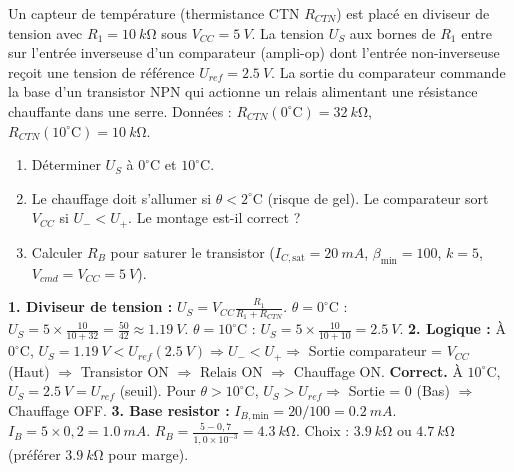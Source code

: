 \documentclass[11pt]{article}
\begin{document}
\begin{exoresolu}
Un capteur de température (thermistance CTN $R_{CTN}$) est placé en diviseur de tension avec $R_1 = \SI{10}{k\ohm}$ sous $V_{CC}=\SI{5}{V}$. La tension $U_S$ aux bornes de $R_1$ entre sur l'entrée inverseuse d'un comparateur (ampli-op) dont l'entrée non-inverseuse reçoit une tension de référence $U_{ref} = \SI{2,5}{V}$. La sortie du comparateur commande la base d'un transistor NPN qui actionne un relais alimentant une résistance chauffante dans une serre.
Données : $R_{CTN}(0^\circ\text{C}) = \SI{32}{k\ohm}$, $R_{CTN}(10^\circ\text{C}) = \SI{10}{k\ohm}$.
\begin{enumerate}
\item Déterminer $U_S$ à $0^\circ\text{C}$ et $10^\circ\text{C}$.
\item Le chauffage doit s'allumer si $\theta < 2^\circ\text{C}$ (risque de gel). Le comparateur sort $V_{CC}$ si $U_- < U_+$. Le montage est-il correct ?
\item Calculer $R_B$ pour saturer le transistor ($I_{C,\text{sat}}=\SI{20}{mA}$, $\beta_{\min}=100$, $k=5$, $V_{cmd}=V_{CC}=\SI{5}{V}$).
\end{enumerate}
\tcblower
\textbf{1. Diviseur de tension :} $U_S = V_{CC} \frac{R_1}{R_1 + R_{CTN}}$.
$\theta = 0^\circ\text{C}$ : $U_S = 5 \times \frac{10}{10+32} = \frac{50}{42} \approx \SI{1,19}{V}$.
$\theta = 10^\circ\text{C}$ : $U_S = 5 \times \frac{10}{10+10} = \SI{2,5}{V}$.
\textbf{2. Logique :} À $0^\circ\text{C}$, $U_S = \SI{1,19}{V} < U_{ref} (\SI{2,5}{V}) \Rightarrow U_- < U_+ \Rightarrow$ Sortie comparateur = $V_{CC}$ (Haut) $\Rightarrow$ Transistor ON $\Rightarrow$ Relais ON $\Rightarrow$ Chauffage ON. \textbf{Correct.}
À $10^\circ\text{C}$, $U_S = \SI{2,5}{V} = U_{ref}$ (seuil). Pour $\theta > 10^\circ\text{C}$, $U_S > U_{ref} \Rightarrow$ Sortie = $0$ (Bas) $\Rightarrow$ Chauffage OFF.
\textbf{3. Base resistor :}
$I_{B,\text{min}} = 20/100 = \SI{0,2}{mA}$.
$I_B = 5 \times 0,2 = \SI{1,0}{mA}$.
$R_B = \frac{5 - 0,7}{1,0 \times 10^{-3}} = \SI{4,3}{k\ohm}$. Choix : $\SI{3,9}{k\ohm}$ ou $\SI{4,7}{k\ohm}$ (préférer $\SI{3,9}{k\ohm}$ pour marge).
\end{exoresolu}
\end{document}
